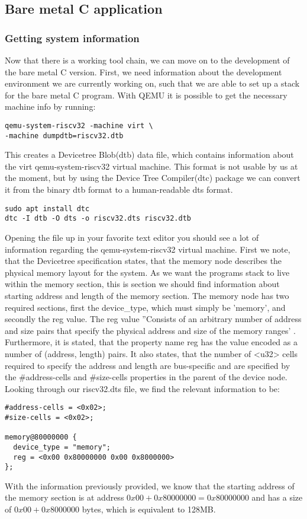 \subsection{Bare metal C application}
\subsubsection{Getting system information}\label{sec:sys-info}
Now that there is a working tool chain, we can move on to the development of the
bare metal C version. First, we need information about the development
environment we are currently working on, such that we are able to set up a stack
for the bare metal C program. With QEMU it is possible to get the necessary
machine info by running:
\begin{lstlisting}
qemu-system-riscv32 -machine virt \
-machine dumpdtb=riscv32.dtb
\end{lstlisting}
This creates a Devicetree Blob(dtb) data file, which contains information about
the virt qemu-system-riscv32 virtual machine. This format is not usable by us
at the moment, but by using the Device Tree Compiler(dtc) package we can convert
it from the binary dtb format to a human-readable dts format.
\begin{lstlisting}
sudo apt install dtc
dtc -I dtb -O dts -o riscv32.dts riscv32.dtb
\end{lstlisting}
Opening the file up in your favorite text editor you should see a lot of
information regarding the qemu-system-riscv32 virtual machine. First we note,
that the Devicetree specification states, that the memory node describes the
physical memory layout for the system. As we want the programs stack
to live within the memory section, this is section we should find information
about starting address and length of the memory section. The memory node has
two required sections, first the device\_type, which must simply be 'memory', and
secondly the reg value. The reg value ''Consists of an arbitrary number of
address and size pairs that specify the physical address and size of the memory
ranges' \cite{DTS}. Furthermore, it is stated, that the property name reg has
the value encoded as a number of (address, length) pairs. It also states, that
the number of <u32> cells required to specify the address and length are
bus-specific and are specified by the \#address-cells and \#size-cells properties
in the parent of the device node.
Looking through our riscv32.dts file, we find the relevant information to be:
\begin{lstlisting}
#address-cells = <0x02>;
#size-cells = <0x02>;

memory@80000000 {
  device_type = "memory";
  reg = <0x00 0x80000000 0x00 0x8000000>
};
\end{lstlisting}
With the information previously provided, we know that the starting
address of the memory section is at address $0x00 + 0x80000000 = 0x80000000$ and has a size of
$0x00 + 0x8000000$ bytes, which is equivalent to 128MB.

